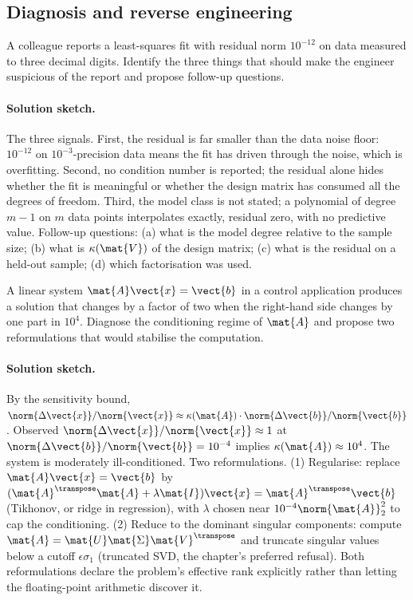 \subsection*{Diagnosis and reverse engineering}

\begin{exercise}
A colleague reports a least-squares fit with residual norm
$10^{-12}$ on data measured to three decimal digits. Identify
the three things that should make the engineer suspicious of the
report and propose follow-up questions.
\end{exercise}

\paragraph{Solution sketch.}
The three signals. First, the residual is far smaller than the data
noise floor: $10^{-12}$ on $10^{-3}$-precision data means the fit
has driven through the noise, which is overfitting. Second, no
condition number is reported; the residual alone hides whether the
fit is meaningful or whether the design matrix has consumed all the
degrees of freedom. Third, the model class is not stated; a
polynomial of degree $m - 1$ on $m$ data points interpolates
exactly, residual zero, with no predictive value. Follow-up
questions: (a) what is the model degree relative to the sample
size; (b) what is $\kappa(\mat{V})$ of the design matrix; (c)
what is the residual on a held-out sample; (d) which factorisation
was used.

\begin{exercise}
A linear system $\mat{A}\vect{x} = \vect{b}$ in a control
application produces a solution that changes by a factor of two
when the right-hand side changes by one part in $10^{4}$. Diagnose
the conditioning regime of $\mat{A}$ and propose two reformulations
that would stabilise the computation.
\end{exercise}

\paragraph{Solution sketch.}
By the sensitivity bound, $\norm{\Delta\vect{x}}/\norm{\vect{x}}
\approx \kappa(\mat{A}) \cdot \norm{\Delta\vect{b}}/\norm{\vect{b}}$.
Observed $\norm{\Delta\vect{x}}/\norm{\vect{x}} \approx 1$ at
$\norm{\Delta\vect{b}}/\norm{\vect{b}} = 10^{-4}$ implies
$\kappa(\mat{A}) \approx 10^{4}$. The system is moderately
ill-conditioned. Two reformulations. (1) Regularise: replace
$\mat{A}\vect{x} = \vect{b}$ by $(\mat{A}^{\transpose}\mat{A} +
\lambda\mat{I})\vect{x} = \mat{A}^{\transpose}\vect{b}$ (Tikhonov,
or ridge in regression), with $\lambda$ chosen near $10^{-4}
\norm{\mat{A}}_{2}^{2}$ to cap the conditioning. (2) Reduce to
the dominant singular components: compute $\mat{A} = \mat{U}
\mat{\Sigma}\mat{V}^{\transpose}$ and truncate singular values
below a cutoff $\epsilon \sigma_{1}$ (truncated SVD, the
chapter's preferred refusal). Both reformulations declare the
problem's effective rank explicitly rather than letting the
floating-point arithmetic discover it.

